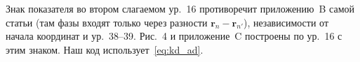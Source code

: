 \begin{cmpbox}
Знак показателя во втором слагаемом ур.~16 противоречит приложению~B самой
статьи (там фазы входят только через разности $\mathbf r_n-\mathbf r_{n'}$),
независимости от начала координат и ур.~38--39. Рис.~4 и приложение~C
построены по ур.~16 с этим знаком. Наш код использует~\eqref{eq:kd_ad}.
\end{cmpbox}
